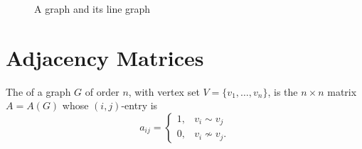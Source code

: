 \begin{Example}
\begin{figure}[!htbp]
\caption{A graph and its line graph}\label{fig:LineGraphs}
\end{figure}
\end{Example}



\section{Adjacency Matrices}\label{sec:AdjMat}

The  of a graph $G$ of order $n$, with vertex set $V = \{v_1, \ldots, v_n\}$, is the $n \times n$ matrix $A = A(G)$ whose $(i,j)$-entry is
\begin{equation*}
a_{ij} = \begin{cases}
1, & v_i \sim v_j \\
0, & v_i \nsim v_j.
\end{cases}
\end{equation*}

